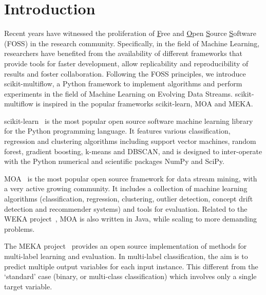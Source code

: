 \documentclass[twoside,11pt]{article}
\newcommand{\skmultiflow}{\textsf{scikit-multiflow}\xspace}
\newcommand{\sklearn}{\textsf{scikit-learn}\xspace}
\newcommand{\weka}{\textsf{WEKA}\xspace}
\newcommand{\moa}{\textsf{MOA}\xspace}
\newcommand{\meka}{\textsf{MEKA}\xspace}
\begin{document}
\section{Introduction}\label{sec:Introduction}
Recent years have witnessed the proliferation of \underline{F}ree and \underline{O}pen \underline{S}ource \underline{S}oftware (FOSS) in the research community. Specifically, in the field of Machine Learning, researchers have benefited from the availability of different frameworks that provide tools for faster development, allow replicability and reproducibility of results and foster collaboration. Following the FOSS principles, we introduce \skmultiflow, a Python framework to implement algorithms and perform experiments in the field of Machine Learning on Evolving Data Streams. \skmultiflow is inspired in the popular frameworks \sklearn, \moa and \meka.

\sklearn~\citep{sklearn} is the most popular open source software machine learning library for the Python programming language. It features various classification, regression and clustering algorithms including support vector machines, random forest, gradient boosting, k-means and DBSCAN, and is designed to inter-operate with the Python numerical and scientific packages NumPy and SciPy.

\moa~\citep{MOA} is the most popular open source framework for data stream mining, with a very active growing community. It includes a collection of machine learning algorithms (classification, regression, clustering, outlier detection, concept drift detection and recommender systems) and tools for evaluation. Related to the \weka project~\citep{WEKA}, \moa is also written in Java, while scaling to more demanding problems. 

The \meka project~\citep{MEKA} provides an open source implementation of methods for multi-label learning and evaluation. In multi-label classification, the aim is to predict multiple output variables for each input instance. This different from the `standard' case (binary, or multi-class classification) which involves only a single target variable.
\end{document}
